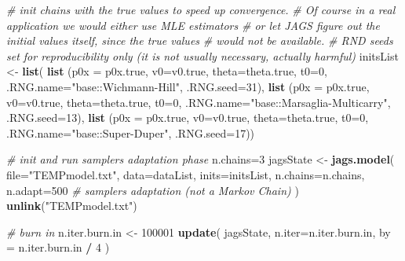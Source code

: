 \documentclass[]{article}
\newenvironment{Shaded}{\begin{snugshade}}{\end{snugshade}}
\newcommand{\CommentTok}[1]{\textcolor[rgb]{0.56,0.35,0.01}{\textit{#1}}}
\newcommand{\DataTypeTok}[1]{\textcolor[rgb]{0.13,0.29,0.53}{#1}}
\newcommand{\DecValTok}[1]{\textcolor[rgb]{0.00,0.00,0.81}{#1}}
\newcommand{\KeywordTok}[1]{\textcolor[rgb]{0.13,0.29,0.53}{\textbf{#1}}}
\newcommand{\NormalTok}[1]{#1}
\newcommand{\OperatorTok}[1]{\textcolor[rgb]{0.81,0.36,0.00}{\textbf{#1}}}
\newcommand{\StringTok}[1]{\textcolor[rgb]{0.31,0.60,0.02}{#1}}
\begin{document}
\begin{Shaded}
\begin{Highlighting}[]
  \CommentTok{# init chains with the true values to speed up convergence.}
  \CommentTok{# Of course in a real application we would either use MLE estimators}
  \CommentTok{# or let JAGS figure out the initial values itself, since the true values}
  \CommentTok{# would not be available.}
  \CommentTok{# RND seeds set for reproducibility only (it is not usually necessary, actually harmful)}
\NormalTok{  initsList <-}\StringTok{ }\KeywordTok{list}\NormalTok{(}
    \KeywordTok{list}\NormalTok{ (}\DataTypeTok{p0x =}\NormalTok{ p0x.true, }\DataTypeTok{v0=}\NormalTok{v0.true, }\DataTypeTok{theta=}\NormalTok{theta.true, }\DataTypeTok{t0=}\DecValTok{0}\NormalTok{, }
          \DataTypeTok{.RNG.name=}\StringTok{"base::Wichmann-Hill"}\NormalTok{, }\DataTypeTok{.RNG.seed=}\DecValTok{31}\NormalTok{),}
    \KeywordTok{list}\NormalTok{ (}\DataTypeTok{p0x =}\NormalTok{ p0x.true, }\DataTypeTok{v0=}\NormalTok{v0.true, }\DataTypeTok{theta=}\NormalTok{theta.true, }\DataTypeTok{t0=}\DecValTok{0}\NormalTok{, }
          \DataTypeTok{.RNG.name=}\StringTok{"base::Marsaglia-Multicarry"}\NormalTok{, }\DataTypeTok{.RNG.seed=}\DecValTok{13}\NormalTok{),}
    \KeywordTok{list}\NormalTok{ (}\DataTypeTok{p0x =}\NormalTok{ p0x.true, }\DataTypeTok{v0=}\NormalTok{v0.true, }\DataTypeTok{theta=}\NormalTok{theta.true, }\DataTypeTok{t0=}\DecValTok{0}\NormalTok{, }
          \DataTypeTok{.RNG.name=}\StringTok{"base::Super-Duper"}\NormalTok{, }\DataTypeTok{.RNG.seed=}\DecValTok{17}\NormalTok{))}
  
  \CommentTok{# init and run samplers adaptation phase}
\NormalTok{  n.chains=}\DecValTok{3}
\NormalTok{  jagsState <-}\StringTok{ }\KeywordTok{jags.model}\NormalTok{( }\DataTypeTok{file=}\StringTok{"TEMPmodel.txt"}\NormalTok{, }\DataTypeTok{data=}\NormalTok{dataList, }\DataTypeTok{inits=}\NormalTok{initsList, }
                           \DataTypeTok{n.chains=}\NormalTok{n.chains, }
                           \DataTypeTok{n.adapt=}\DecValTok{500} \CommentTok{# samplers adaptation (not a Markov Chain)}
\NormalTok{                         )}
  \KeywordTok{unlink}\NormalTok{(}\StringTok{"TEMPmodel.txt"}\NormalTok{)}
  
  \CommentTok{# burn in }
\NormalTok{  n.iter.burn.in <-}\StringTok{ }\DecValTok{100001}
  \KeywordTok{update}\NormalTok{( jagsState, }\DataTypeTok{n.iter=}\NormalTok{n.iter.burn.in, }\DataTypeTok{by =}\NormalTok{ n.iter.burn.in }\OperatorTok{/}\StringTok{ }\DecValTok{4}\NormalTok{ )}
  

\end{Highlighting}
\end{Shaded}
\end{document}
